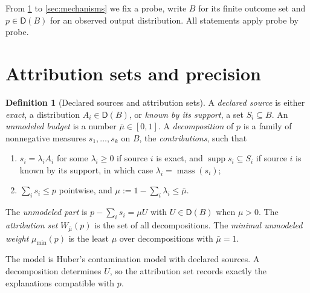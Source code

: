 \documentclass[11pt]{article}
\theoremstyle{definition}
\newtheorem{definition}[theorem]{Definition}
\theoremstyle{remark}
\newcommand{\D}{\mathsf{D}}
\newcommand{\supp}{\operatorname{supp}}
\newcommand{\mass}{\operatorname{mass}}
\begin{document}
From \cref{sec:attribution} to \cref{sec:mechanisms} we fix a probe, write $B$ for its finite outcome
set and $p\in\D(B)$ for an observed output distribution. All statements apply probe by probe.

\section{Attribution sets and precision}\label{sec:attribution}

\begin{definition}[Declared sources and attribution sets]\label{def:attset}
A \emph{declared source} is either \emph{exact}, a distribution $A_i\in\D(B)$, or \emph{known by its
support}, a set $S_i\subseteq B$. An \emph{unmodeled budget} is a number $\bar\mu\in[0,1]$. A
\emph{decomposition} of $p$ is a family of nonnegative measures $s_1,\dots,s_k$ on $B$, the
\emph{contributions}, such that
\begin{enumerate}[label=(\alph*)]
\item $s_i=\lambda_iA_i$ for some $\lambda_i\ge0$ if source $i$ is exact, and $\supp s_i\subseteq S_i$
  if source $i$ is known by its support, in which case $\lambda_i=\mass(s_i)$;
\item $\sum_is_i\le p$ pointwise, and $\mu:=1-\sum_i\lambda_i\le\bar\mu$.
\end{enumerate}
The \emph{unmodeled part} is $p-\sum_is_i=\mu U$ with $U\in\D(B)$ when $\mu>0$. The \emph{attribution
set} $W_{\bar\mu}(p)$ is the set of all decompositions. The \emph{minimal unmodeled weight}
$\mu_{\min}(p)$ is the least $\mu$ over decompositions with $\bar\mu=1$.
\end{definition}

The model is Huber's contamination model \cite{Huber1964} with declared sources. A decomposition
determines $U$, so the attribution set records exactly the explanations compatible with $p$.
\end{document}
